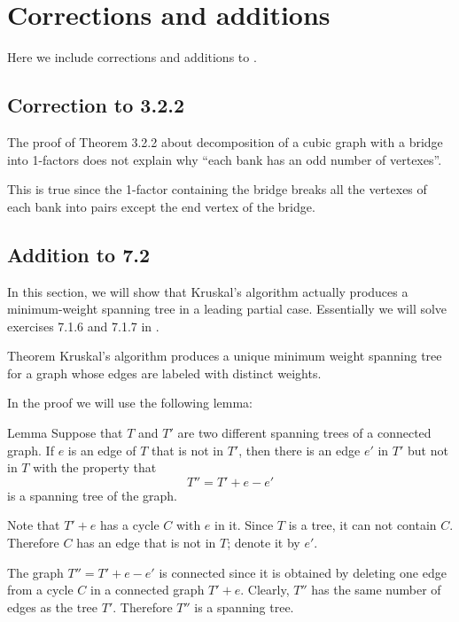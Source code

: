 \chapter{Corrections and additions}

Here we include corrections and additions to \cite{pearls}.

\section*{Correction to 3.2.2}

The proof of Theorem 3.2.2 about decomposition of a cubic graph with a bridge into 1-factors
does not explain why ``each bank has an odd number of vertexes''.

This is true since the 1-factor containing the bridge breaks all the vertexes of each bank into pairs except the end vertex of the bridge.



\section*{Addition to 7.2}

In this section, we will show that Kruskal’s algorithm actually produces a minimum-weight spanning tree in a leading partial case.
Essentially we will solve exercises 7.1.6 and 7.1.7 in \cite{pearls}. 

\begin{thm}{Theorem}
Kruskal’s algorithm produces a unique minimum weight spanning tree for a graph whose edges are labeled with
distinct weights. 

\end{thm}

In the proof we will use the following lemma:

\begin{thm}{Lemma}\label{lem:T+e-e}
Suppose that $T$ and $T'$ are two different spanning trees of a connected
graph. 
If $e$ is an edge of $T$ that is not in $T'$, then there is an edge $e'$
in $T'$ but not in $T$ with the property that 
\[T''=T' + e - e'\]
is a spanning tree of the
graph.
\end{thm}

Note that $T' + e$ has a cycle $C$ with $e$ in it.
Since $T$ is a tree, it can not contain $C$.
Therefore $C$ has an edge that is not in $T$;
denote it by $e'$.

The graph $T''=T' + e-e'$ is connected since it is obtained by deleting one edge from a cycle $C$ in a connected graph $T' + e$.
Clearly, $T''$ has the same number of edges as the tree $T'$.
Therefore $T''$ is a spanning tree.
\qeds

